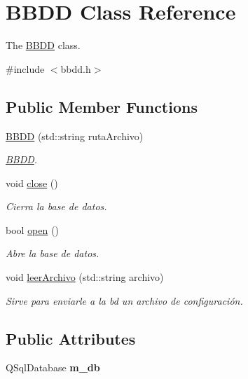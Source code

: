 \hypertarget{classBBDD}{}\section{B\+B\+DD Class Reference}
\label{classBBDD}


The \mbox{\hyperlink{classBBDD}{B\+B\+DD}} class.  




{\ttfamily \#include $<$bbdd.\+h$>$}

\subsection*{Public Member Functions}
\begin{DoxyCompactItemize}
\item 
\mbox{\hyperlink{classBBDD_af556bed2cf0765466a00bb04a4eb285f}{B\+B\+DD}} (std\+::string ruta\+Archivo)
\begin{DoxyCompactList}\small\item\em \mbox{\hyperlink{classBBDD}{B\+B\+DD}}. \end{DoxyCompactList}\item 
\mbox{\label{classBBDD_ada272757cbf6fbb4cca5dc5a3249d8e6}} 
void \mbox{\hyperlink{classBBDD_ada272757cbf6fbb4cca5dc5a3249d8e6}{close}} ()
\begin{DoxyCompactList}\small\item\em Cierra la base de datos. \end{DoxyCompactList}\item 
\mbox{\label{classBBDD_ada96cca045dd322ce160473f0b211aed}} 
bool \mbox{\hyperlink{classBBDD_ada96cca045dd322ce160473f0b211aed}{open}} ()
\begin{DoxyCompactList}\small\item\em Abre la base de datos. \end{DoxyCompactList}\item 
void \mbox{\hyperlink{classBBDD_a4148c125314b6c3dafcfb25b142f1644}{leer\+Archivo}} (std\+::string archivo)
\begin{DoxyCompactList}\small\item\em Sirve para enviarle a la bd un archivo de configuración. \end{DoxyCompactList}\end{DoxyCompactItemize}
\subsection*{Public Attributes}
\begin{DoxyCompactItemize}
\item 
\mbox{\label{classBBDD_acb731934345eb4b133b1c42bffbc7a8f}} 
Q\+Sql\+Database {\bfseries m\+\_\+db}
\end{DoxyCompactItemize}


